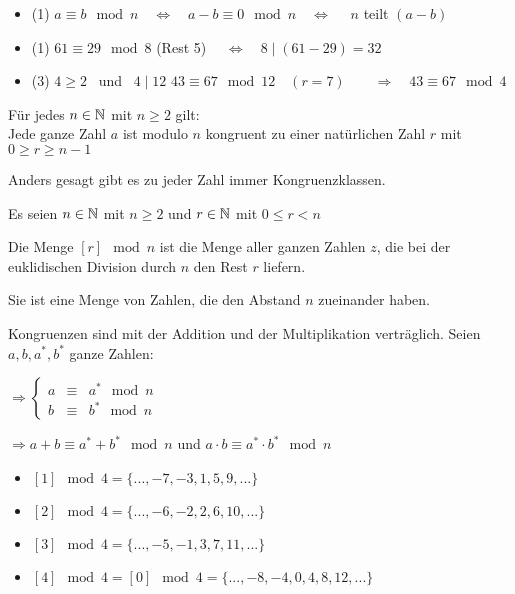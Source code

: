 \documentclass[main.tex]{subfiles}
\begin{document}
\begin{Beweis}
	\begin{itemize}
		\item (1) \quad $ a \equiv b \mod n \quad\Leftrightarrow\quad a - b \equiv 0 \mod n \quad\Leftrightarrow\quad $ $n$ teilt $(a-b)$
	\end{itemize}
\end{Beweis}

\begin{Beispiel}
	\begin{itemize}
		\item (1) \quad $61 \equiv 29 \mod 8$ \quad (Rest 5) $\quad\Leftrightarrow\quad 8\mid  (61-29) = 32 $
		\item (3) \quad $4 \geq 2$ \, und \, $4\mid 12$ \quad $43 \equiv 67 \mod 12 \quad(r=7)\qquad \Rightarrow \quad 43 \equiv 67 \mod 4  $
	\end{itemize}
\end{Beispiel}

\begin{Theorem}
	Für jedes $n\in \mathbb{N}$ mit $n\geq 2$ gilt: \\Jede ganze Zahl $a$ ist modulo $n$ kongruent zu einer natürlichen Zahl $r$ mit $0 \geq r \geq n-1$
	
	Anders gesagt gibt es zu jeder Zahl immer Kongruenzklassen.
\end{Theorem}

\begin{Definition}
	Es seien $n \in \mathbb{N}$ mit $n \geq 2$ und $r \in \mathbb{N}$ mit $0 \leq r < n$

	Die Menge $ [r] \mod n $ ist die Menge aller ganzen Zahlen $z$, die bei der euklidischen Division durch $n$ den Rest $r$ liefern.
	
	Sie ist eine Menge von Zahlen, die den Abstand $n$ zueinander haben.
	
	Kongruenzen sind mit der Addition und der Multiplikation verträglich. Seien $a, b, a^{*}, b^{*}$ ganze Zahlen:
	
	$\Rightarrow \left \{ \begin{array}{rcl}
		a & \equiv & a^{*} \mod n  \\
		b & \equiv & b^{*}\mod n
	\end{array} \right .$

	$\Rightarrow a+b \equiv a^{*} + b^{*} \mod n$ \qquad und \qquad  $a\cdot b \equiv a^{*} \cdot b^{*} \mod n$
\end{Definition}

\begin{Beispiel}
	\begin{itemize}
		\item $ [1] \mod 4 = \{ ... , -7, -3, 1, 5, 9, ... \} $
		\item $ [2] \mod 4 = \{ ... , -6, -2, 2, 6, 10, ... \} $
		\item $ [3] \mod 4 = \{ ... , -5, -1, 3, 7, 11, ... \} $
		\item $ [4] \mod 4 = [0] \mod 4 = \{ ... , -8, -4, 0, 4, 8, 12, ... \} $\\
	\end{itemize}
\end{Beispiel}
\end{document}
